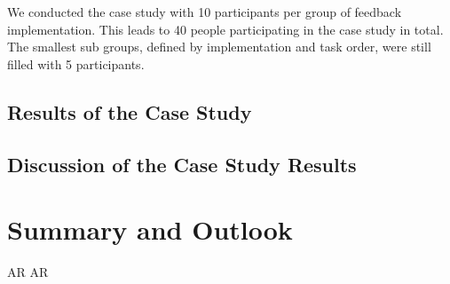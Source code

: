 \documentclass[11pt, a4paper]{article}
\begin{document}
			We conducted the case study with 10 participants per group of feedback implementation. This leads to 40 people participating in the case study in total. The smallest sub groups, defined by implementation and task order, were still filled with 5 participants.

		\subsection*{Results of the Case Study}\label{ssec:results}

		\subsection*{Discussion of the Case Study Results}\label{ssec:discussion}

	\section*{Summary and Outlook}\label{sec:summary}
		\cite{Dey2016} \cite{Nilsson2007} \cite{Poupyrev2002} \ac{AR} \ac{AR}

	\pagebreak
	\printbibliography
\restoregeometry
\end{document}

